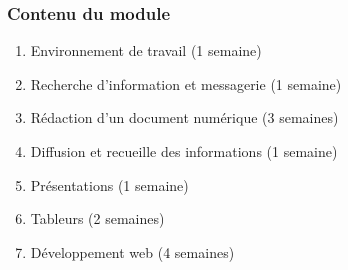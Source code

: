 \documentclass{beamer}
\begin{document}
\begin{frame}
\frametitle{Contenu du module}

\begin{enumerate}
	\item Environnement de travail (1 semaine)
	\item Recherche d'information et messagerie (1 semaine)
	\item Rédaction d'un document numérique (3 semaines)
	\item Diffusion et recueille des informations (1 semaine)
	\item Présentations (1 semaine)
	\item Tableurs (2 semaines) 
	\item Développement web (4 semaines)
\end{enumerate}

\end{frame}

%
% 
\end{document}
